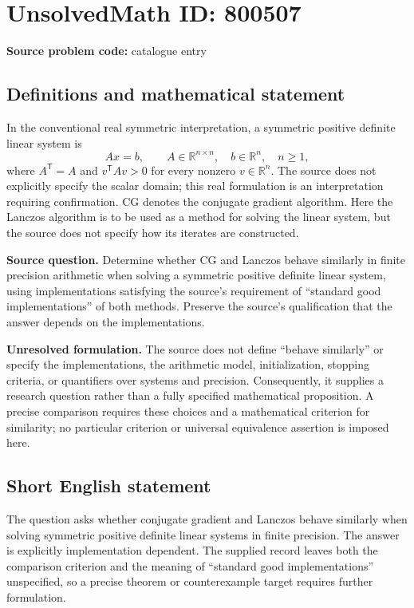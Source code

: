 \documentclass[11pt]{article}
\newcommand{\R}{\mathbb{R}}
\begin{document}
\section*{UnsolvedMath ID: 800507}
\textbf{Source problem code:} catalogue entry
\subsection{Definitions and mathematical statement}
In the conventional real symmetric interpretation, a symmetric positive definite linear system is
\[
Ax=b,\qquad A\in\R^{n\times n},\quad b\in\R^n,\quad n\geq 1,
\]
where \(A^{\mathsf T}=A\) and \(v^{\mathsf T}Av>0\) for every nonzero \(v\in\R^n\). The source does not explicitly specify the scalar domain; this real formulation is an interpretation requiring confirmation. CG denotes the conjugate gradient algorithm. Here the Lanczos algorithm is to be used as a method for solving the linear system, but the source does not specify how its iterates are constructed.

\textbf{Source question.} Determine whether CG and Lanczos behave similarly in finite precision arithmetic when solving a symmetric positive definite linear system, using implementations satisfying the source's requirement of ``standard good implementations'' of both methods. Preserve the source's qualification that the answer depends on the implementations.

\textbf{Unresolved formulation.} The source does not define ``behave similarly'' or specify the implementations, the arithmetic model, initialization, stopping criteria, or quantifiers over systems and precision. Consequently, it supplies a research question rather than a fully specified mathematical proposition. A precise comparison requires these choices and a mathematical criterion for similarity; no particular criterion or universal equivalence assertion is imposed here.
\subsection{Short English statement}
The question asks whether conjugate gradient and Lanczos behave similarly when solving symmetric positive definite linear systems in finite precision. The answer is explicitly implementation dependent. The supplied record leaves both the comparison criterion and the meaning of ``standard good implementations'' unspecified, so a precise theorem or counterexample target requires further formulation.
\end{document}

